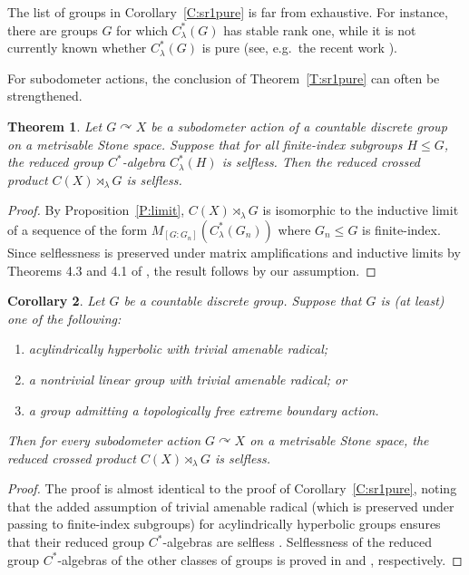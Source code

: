 \documentclass[11pt,a4,leqno]{amsart}
\newtheorem{thm}{Theorem}[section]
\newtheorem{cor}[thm]{Corollary}
\theoremstyle{definition}
\theoremstyle{remark}
\numberwithin{equation}{section}
\theoremstyle{plain}
\begin{document}
The list of groups in Corollary~\ref{C:sr1pure} is far from exhaustive. For instance, there are groups $G$ for which $C^*_\lambda(G)$ has stable rank one, while it is not currently known whether $C^*_\lambda(G)$ is pure (see, e.g.\ the recent work \cite{KerPet26}). 

For subodometer actions, the conclusion of Theorem~\ref{T:sr1pure} can often be strengthened. 

\begin{thm}\label{T:self}
    Let $G\curvearrowright X$ be a subodometer action of a countable discrete group on a metrisable Stone space. Suppose that for all finite-index subgroups $H\le G$, the reduced group $C^*$-algebra $C^*_\lambda(H)$ is selfless. Then the reduced crossed product $C(X)\rtimes_\lambda G$ is selfless. 
\end{thm}

\begin{proof}
    By Proposition~\ref{P:limit}, $C(X)\rtimes_\lambda G$ is isomorphic to the inductive limit of a sequence of the form $M_{[G:G_n]}(C^*_\lambda(G_n))$ where $G_n \le G$ is finite-index. Since selflessness is preserved under matrix amplifications and inductive limits by Theorems 4.3 and 4.1 of \cite{Rob25}, the result follows by our assumption. 
\end{proof}

\begin{cor}\label{C:self}
    Let $G$ be a countable discrete group. Suppose that $G$ is (at least) one of the following:
    \begin{enumerate}
        \item acylindrically hyperbolic with trivial amenable radical;
        \item a nontrivial linear group with trivial amenable radical; or
        \item a group admitting a topologically free extreme boundary action.
    \end{enumerate}
    Then for every subodometer action $G\curvearrowright X$ on a metrisable Stone space, the reduced crossed product $C(X)\rtimes_\lambda G$ is selfless. 
\end{cor}

\begin{proof}
    The proof is almost identical to the proof of Corollary~\ref{C:sr1pure}, noting that the added assumption of trivial amenable radical (which is preserved under passing to finite-index subgroups) for acylindrically hyperbolic groups ensures that their reduced group $C^*$-algebras are selfless \cite{Oza25}. Selflessness of the reduced group $C^*$-algebras of the other classes of groups is proved in \cite{Vig26} and \cite{Oza25}, respectively. 
\end{proof}
\end{document}
